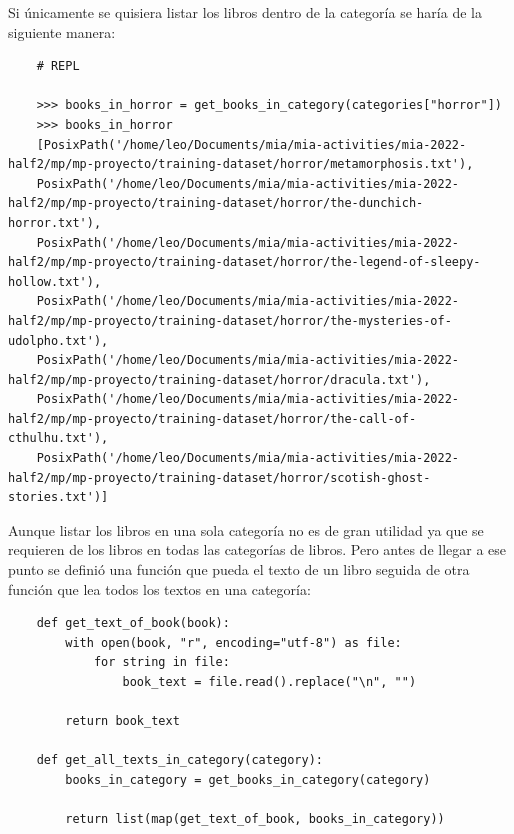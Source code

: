 Si únicamente se quisiera listar los libros dentro de la categoría  se haría de la siguiente manera:
\begin{verbatim}
    # REPL

    >>> books_in_horror = get_books_in_category(categories["horror"])
    >>> books_in_horror
    [PosixPath('/home/leo/Documents/mia/mia-activities/mia-2022-half2/mp/mp-proyecto/training-dataset/horror/metamorphosis.txt'),
    PosixPath('/home/leo/Documents/mia/mia-activities/mia-2022-half2/mp/mp-proyecto/training-dataset/horror/the-dunchich-horror.txt'),
    PosixPath('/home/leo/Documents/mia/mia-activities/mia-2022-half2/mp/mp-proyecto/training-dataset/horror/the-legend-of-sleepy-hollow.txt'),
    PosixPath('/home/leo/Documents/mia/mia-activities/mia-2022-half2/mp/mp-proyecto/training-dataset/horror/the-mysteries-of-udolpho.txt'),
    PosixPath('/home/leo/Documents/mia/mia-activities/mia-2022-half2/mp/mp-proyecto/training-dataset/horror/dracula.txt'),
    PosixPath('/home/leo/Documents/mia/mia-activities/mia-2022-half2/mp/mp-proyecto/training-dataset/horror/the-call-of-cthulhu.txt'),
    PosixPath('/home/leo/Documents/mia/mia-activities/mia-2022-half2/mp/mp-proyecto/training-dataset/horror/scotish-ghost-stories.txt')]
\end{verbatim}

Aunque listar los libros en una sola categoría no es de gran utilidad ya que se requieren de los libros en todas las categorías de libros. Pero antes de llegar a ese punto se definió una función que pueda el texto de un libro seguida de otra función que lea todos los textos en una categoría:
\begin{verbatim}
    def get_text_of_book(book):
        with open(book, "r", encoding="utf-8") as file:
            for string in file:
                book_text = file.read().replace("\n", "")
                
        return book_text

    def get_all_texts_in_category(category):
        books_in_category = get_books_in_category(category)
        
        return list(map(get_text_of_book, books_in_category))
\end{verbatim}

